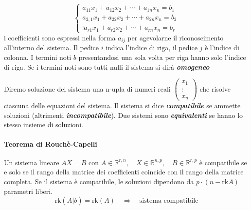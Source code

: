 \documentclass[x11names]{article}
\begin{document}
 $$ {\begin{cases}a_{11}x_{1}+a_{12}x_{2}+\cdots +a_{1n}x_{n}=b_{1}\\a_{2,1}x_{1}+a_{22}x_{2}+\cdots +a_{2n}x_{n}=b_{2}\\\vdots a_{r1}x_{1}+a_{r2}x_{2}+\cdots +a_{rn}x_{n}=b_{r}\end{cases}} $$
 i coefficienti sono espressi nella forma $a_{ij}$ per agevolarne il riconoscimento all'interno del sistema. Il  pedice $i$ indica l'indice di riga, il pedice $j$ è l'indice di colonna. I termini noti $b$ presentandosi una sola volta per riga hanno solo l'indice di riga.
 Se i termini noti sono tutti nulli il sistema si dirà \textbf{\textit{omogeneo}}

 Diremo soluzione del sistema una n-upla di numeri reali $\begin{pmatrix}x_{1}\\ \vdots \\ x_{n}\end{pmatrix}$ che risolve ciascuna delle equazioni del sistema. Il sistema si dice \textbf{\textit{compatibile}} se ammette soluzioni (altrimenti \textbf{\textit{incompatibile}}).  Due sistemi sono \textbf{\textit{equivalenti}} se hanno lo stesso insieme di soluzioni. 
 
\begin{center}

\end{center}

\begin{center}
\colorbox{Bisque1}{\begin{minipage}{5.75in}
\begin{yes}{}


\paragraph{Teorema di Rouchè-Capelli}
Un sistema lineare $AX = B$  con $A \in \mathbb{R}^{r,n}, \quad X \in \mathbb{R}^{n,p}, \quad B \in \mathbb{R}^{r,p}$ è compatibile se e solo se il rango della matrice
dei coefficienti coincide con il rango della matrice completa. Se il sistema è compatibile, le soluzioni dipendono da $p \cdot \left(n-\text{rk}A\right)$ parametri liberi.
\[
	\text{rk}\left(A|\overline{b}\right) = \text{rk}\left(A\right) \quad \Rightarrow \quad \text{sistema compatibile}
\] 
\end{yes}
\end{minipage}}        
\end{center}
\end{document}
